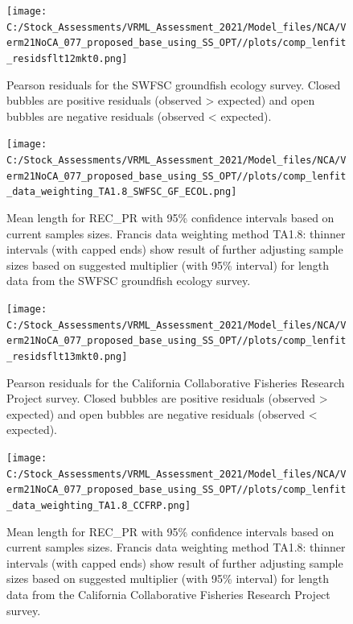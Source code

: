 \documentclass[
  english,
  a4paper,
]{article}
\begin{document}
\begin{figure}
\centering
\texttt{[image: C:/Stock\_Assessments/VRML\_Assessment\_2021/Model\_files/NCA/Verm21NoCA\_077\_proposed\_base\_using\_SS\_OPT//plots/comp\_lenfit\_residsflt12mkt0.png]}
\caption{Pearson residuals for the SWFSC groundfish ecology survey. Closed bubbles are positive residuals (observed \textgreater{} expected) and open bubbles are negative residuals (observed \textless{} expected).\label{fig:len-pearson-SWFSC-GF-ECOL}}
\end{figure}

\begin{figure}
\centering
\texttt{[image: C:/Stock\_Assessments/VRML\_Assessment\_2021/Model\_files/NCA/Verm21NoCA\_077\_proposed\_base\_using\_SS\_OPT//plots/comp\_lenfit\_data\_weighting\_TA1.8\_SWFSC\_GF\_ECOL.png]}
\caption{Mean length for REC\_PR with 95\% confidence intervals based on current samples sizes. Francis data weighting method TA1.8: thinner intervals (with capped ends) show result of further adjusting sample sizes based on suggested multiplier (with 95\% interval) for length data from the SWFSC groundfish ecology survey.\label{fig:mean-len-fit-SWFSC-GF-ECOL}}
\end{figure}

\begin{figure}
\centering
\texttt{[image: C:/Stock\_Assessments/VRML\_Assessment\_2021/Model\_files/NCA/Verm21NoCA\_077\_proposed\_base\_using\_SS\_OPT//plots/comp\_lenfit\_residsflt13mkt0.png]}
\caption{Pearson residuals for the California Collaborative Fisheries Research Project survey. Closed bubbles are positive residuals (observed \textgreater{} expected) and open bubbles are negative residuals (observed \textless{} expected).\label{fig:len-pearson-CCFRP}}
\end{figure}

\begin{figure}
\centering
\texttt{[image: C:/Stock\_Assessments/VRML\_Assessment\_2021/Model\_files/NCA/Verm21NoCA\_077\_proposed\_base\_using\_SS\_OPT//plots/comp\_lenfit\_data\_weighting\_TA1.8\_CCFRP.png]}
\caption{Mean length for REC\_PR with 95\% confidence intervals based on current samples sizes. Francis data weighting method TA1.8: thinner intervals (with capped ends) show result of further adjusting sample sizes based on suggested multiplier (with 95\% interval) for length data from the California Collaborative Fisheries Research Project survey.\label{fig:mean-len-fit-CCFRP}}
\end{figure}
\end{document}
